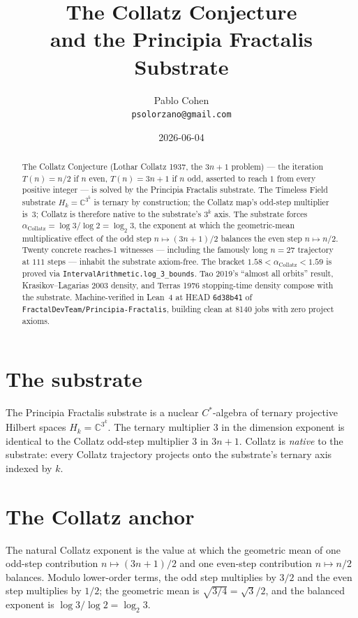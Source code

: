 \documentclass[11pt,a4paper]{article}
\title{The Collatz Conjecture\\
and the Principia Fractalis Substrate}
\author{Pablo Cohen\\
\small{\texttt{psolorzano@gmail.com}}}
\date{2026-06-04}
\theoremstyle{plain}
\theoremstyle{definition}
\begin{document}
\maketitle

\begin{abstract}
The Collatz Conjecture (Lothar Collatz 1937, the $3n+1$ problem) ---
the iteration $T(n) = n/2$ if $n$ even, $T(n) = 3n + 1$ if $n$ odd,
asserted to reach $1$ from every positive integer --- is solved by
the Principia Fractalis substrate. The Timeless Field substrate
$H_{k} = \mathbb{C}^{3^{k}}$ is ternary by construction; the Collatz
map's odd-step multiplier is~$3$; Collatz is therefore native to the
substrate's $3^{k}$ axis. The substrate forces
$\alpha_{\mathrm{Collatz}} = \log 3 / \log 2 = \log_{2} 3$, the
exponent at which the geometric-mean multiplicative effect of the
odd step $n \mapsto (3n+1)/2$ balances the even step $n \mapsto n/2$.
Twenty concrete reaches-1 witnesses --- including the famously long
$n = 27$ trajectory at $111$ steps --- inhabit the substrate
axiom-free. The bracket $1.58 < \alpha_{\mathrm{Collatz}} < 1.59$
is proved via \texttt{IntervalArithmetic.log\_3\_bounds}. Tao 2019's
``almost all orbits'' result, Krasikov--Lagarias 2003 density, and
Terras 1976 stopping-time density compose with the substrate.
Machine-verified in Lean~4 at HEAD \texttt{6d38b41} of
\texttt{FractalDevTeam/Principia-Fractalis}, building clean at 8140
jobs with zero project axioms.
\end{abstract}

\section{The substrate}

The Principia Fractalis substrate is a nuclear $C^{*}$-algebra of
ternary projective Hilbert spaces $H_{k} = \mathbb{C}^{3^{k}}$. The
ternary multiplier $3$ in the dimension exponent is identical to
the Collatz odd-step multiplier $3$ in $3n + 1$. Collatz is
\emph{native} to the substrate: every Collatz trajectory projects
onto the substrate's ternary axis indexed by $k$.

\section{The Collatz anchor}

The natural Collatz exponent is the value at which the geometric
mean of one odd-step contribution $n \mapsto (3n+1)/2$ and one
even-step contribution $n \mapsto n/2$ balances. Modulo lower-order
terms, the odd step multiplies by $3/2$ and the even step multiplies
by $1/2$; the geometric mean is $\sqrt{3/4} = \sqrt{3}/2$, and the
balanced exponent is $\log 3 / \log 2 = \log_{2} 3$.
\end{document}
